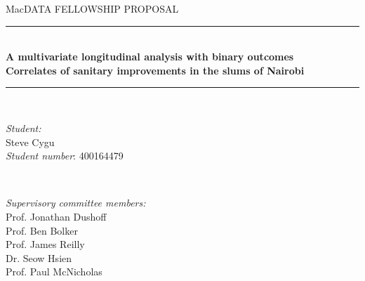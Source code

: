 \documentclass[12pt]{article}
\begin{document}
\begin{titlepage}

\newcommand{\HRule}{\rule{\linewidth}{0.5mm}} %

\center %


\Large MacDATA FELLOWSHIP PROPOSAL\\[0.5cm] %


\HRule \\[0.4cm]
{ \bfseries
{\Huge A multivariate longitudinal analysis with binary outcomes} \\
{\large Correlates of sanitary improvements in the slums of Nairobi}\\[0.4cm]}
\HRule \\[1.5cm]



\begin{minipage}{0.3\textwidth}
\begin{flushleft} \large
\emph{Student:}\\
Steve Cygu\\
\emph{Student number}: 400164479 %
\end{flushleft}
\end{minipage}
~
\begin{minipage}{0.6\textwidth}
\begin{flushright} \large
\emph{Supervisory committee members:} \\
Prof. Jonathan Dushoff\\ %
Prof. Ben Bolker\\
Prof. James Reilly\\
Dr. Seow Hsien\\
Prof. Paul McNicholas
\end{flushright}
\end{minipage}\\[2cm]


\end{titlepage}
\end{document}
